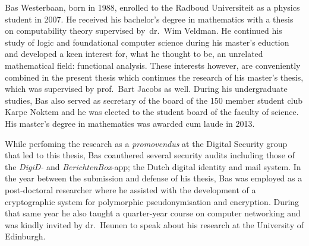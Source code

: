 

Bas Westerbaan, born in 1988,
    enrolled to the Radboud Universiteit
     as a physics student in 2007.
He received his bachelor's degree in
    mathematics with a thesis on computability theory
    supervised by~dr.~Wim Veldman.
He continued his study of logic and foundational computer science
    during his master's eduction and developed a keen interest for,
     what he thought to be, an unrelated mathematical field:
        functional analysis.
These interests however, are conveniently combined in the present thesis
    which continues the research of his master's thesis,
    which was supervised by prof.~Bart Jacobs as well.
During his undergraduate studies,
    Bas also served as secretary of the board of the 150 member student club
        Karpe Noktem and he was elected to
        the student board of the faculty of science.
His master's degree in mathematics was awarded cum laude in 2013.

While perfoming the research as a \emph{promovendus}
    at the Digital Security group that led to this thesis,
    Bas coauthered several security audits
        including those of the \emph{DigiD-} and \emph{BerichtenBox}-app;
        the Dutch digital identity and mail system. 
In the year between the submission and defense
    of his thesis, Bas was employed as a post-doctoral researcher
    where he assisted with the development of a cryptographic system
    for polymorphic pseudonymisation and encryption.
During that same year he also taught a quarter-year course on
    computer networking
        and was kindly invited by dr.~Heunen
        to speak about his research at the University of Edinburgh.
